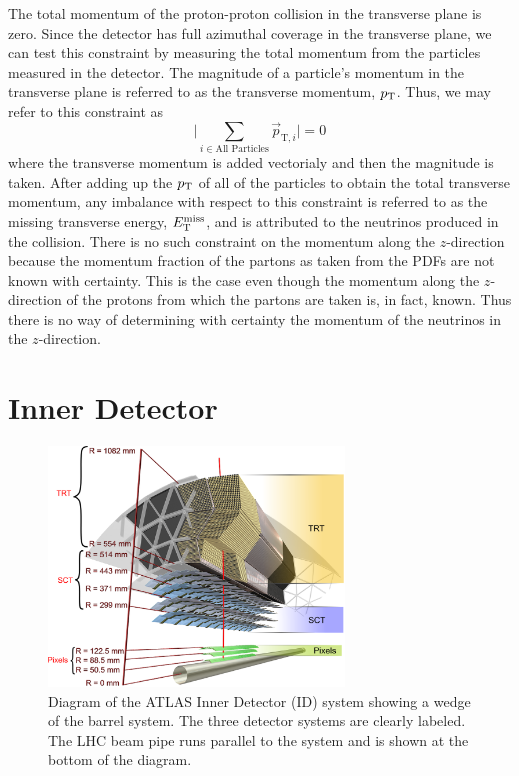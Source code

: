 The total momentum of the proton-proton collision in the transverse
plane is zero. Since the detector has full azimuthal coverage 
in the transverse plane, we can test this constraint by measuring
the total momentum from the particles measured in the detector.
The magnitude of a particle's momentum 
in the transverse plane is referred to as the 
transverse momentum, $p_{\mathrm{T}}$.
Thus, we may refer to this constraint as
\begin{equation}
\Bigg| \sum_{i\in\textrm{All Particles}} \vec{p}_{\textrm{T},i} \Bigg| = 0
\end{equation}
where the transverse momentum is added vectorialy and then
the magnitude is taken.
After adding up the $p_{\mathrm{T}}$ of all of the particles to obtain
the total transverse momentum, 
any imbalance with respect to this constraint
is referred to as the
missing transverse energy, $E_{\mathrm{T}}^{\mathrm{miss}}$, and is attributed to the 
neutrinos produced in the collision. 
There is no such constraint on the momentum along the $z$-direction
because the momentum fraction of the partons as taken
from the PDFs are not known with certainty. This is the case
even though the momentum along the $z$-direction of the 
protons from which the partons are taken is, in fact, known.
Thus there is no way of determining with certainty the 
momentum of the neutrinos in the $z$-direction.



\section{Inner Detector}
\label{sec:atlas_id}

\begin{figure}[ht!]
\centering
\includegraphics[width=0.7\textwidth]{figures/atlas/id_barrel.eps}
\caption{Diagram of the ATLAS Inner Detector (ID) system showing 
a wedge of the barrel system.  The three detector systems
are clearly labeled. The LHC beam pipe runs parallel to the system
and is shown at the bottom of the diagram.}
\label{fig:atlas_id_barrel}
\end{figure}

